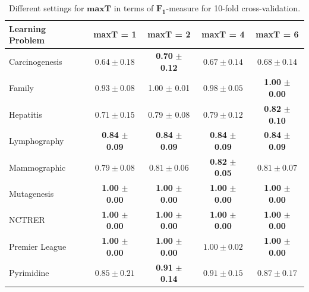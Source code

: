 \begin{table}[tbp]
    \centering
	\caption{Different settings for $\boldsymbol{maxT}$ in terms of $\boldsymbol{F_1}$-mea\-sure for 10-fold cross-validation.}%
	\label{tab:maxt}
	\setlength{\tabcolsep}{6pt}
	\footnotesize
	\begin{tabular}{@{}lcccc@{}}
			\toprule
			\textbf{Learning Problem} & \textbf{maxT = 1} & \textbf{maxT = 2} &
			\textbf{maxT = 4} & \textbf{maxT = 6} \\
			\midrule
			Carcinogenesis  & $0.64 \pm 0.18$& \textbf{0.70} $\boldsymbol{\pm}$ \textbf{0.12} & $0.67 \pm 0.14$ & $0.68 \pm 0.14$  \\
			 
			Family & $0.93 \pm 0.08$ & 1.00 $\pm$ 0.01 & $0.98 \pm 0.05$ & \textbf{1.00} $\boldsymbol{\pm}$ \textbf{0.00}\\
			
			Hepatitis & $0.71 \pm 0.15$ & 0.79 $\pm$ 0.08 & $0.79 \pm 0.12$ & \textbf{0.82} $\boldsymbol{\pm}$ \textbf{0.10}\\
			
			Lymphography & \textbf{0.84} $\boldsymbol{\pm}$ \textbf{0.09} & \textbf{0.84} $\boldsymbol{\pm}$ \textbf{0.09} & \textbf{0.84} $\boldsymbol{\pm}$ \textbf{0.09} & \textbf{0.84} $\boldsymbol{\pm}$ \textbf{0.09}\\
			
			Mammographic & $0.79 \pm 0.08$ & $0.81 \pm 0.06$ & \textbf{0.82} $\boldsymbol{\pm}$ \textbf{0.05} & $0.81 \pm 0.07$\\
			 
			Mutagenesis & \textbf{1.00} $\boldsymbol{\pm}$ \textbf{0.00} & \textbf{1.00} $\boldsymbol{\pm}$ \textbf{0.00} & \textbf{1.00} $\boldsymbol{\pm}$ \textbf{0.00} & \textbf{1.00} $\boldsymbol{\pm}$ \textbf{0.00}\\
			
			NCTRER & \textbf{1.00} $\boldsymbol{\pm}$ \textbf{0.00} & \textbf{1.00} $\boldsymbol{\pm}$ \textbf{0.00} & \textbf{1.00} $\boldsymbol{\pm}$ \textbf{0.00} & \textbf{1.00} $\boldsymbol{\pm}$ \textbf{0.00}\\
			
			Premier League & \textbf{1.00} $\boldsymbol{\pm}$ \textbf{0.00} & \textbf{1.00} $\boldsymbol{\pm}$ \textbf{0.00} & $1.00 \pm 0.02$ & \textbf{1.00} $\boldsymbol{\pm}$ \textbf{0.00} \\
			
			Pyrimidine & $0.85 \pm 0.21$ & \textbf{0.91} $\boldsymbol{\pm}$ \textbf{0.14} & $0.91 \pm 0.15$ & $0.87 \pm 0.17$\\
			
			\bottomrule
	\end{tabular}
\end{table}